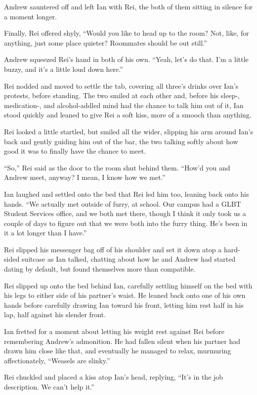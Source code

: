 \documentclass[12pt,letterpaper,oneside]{memoir}
\begin{document}
  Andrew sauntered off and left Ian with Rei, the both of them sitting in silence for a moment longer.

  Finally, Rei offered shyly, ``Would you like to head up to the room? Not, like, for anything, just some place quieter? Roommates should be out still.''

  Andrew squeezed Rei's hand in both of his own. ``Yeah, let's do that. I'm a little buzzy, and it's a little loud down here.''

  Rei nodded and moved to settle the tab, covering all three's drinks over Ian's protests, before standing. The two smiled at each other and, before his sleep-, medication-, and alcohol-addled mind had the chance to talk him out of it, Ian stood quickly and leaned to give Rei a soft kiss, more of a smooch than anything.

  Rei looked a little startled, but smiled all the wider, slipping his arm around Ian's back and gently guiding him out of the bar, the two talking softly about how good it was to finally have the chance to meet.

  ``So,'' Rei said as the door to the room shut behind them. ``How'd you and Andrew meet, anyway? I mean, I know how we met.''

  Ian laughed and settled onto the bed that Rei led him too, leaning back onto his hands. ``We actually met outside of furry, at school. Our campus had a GLBT Student Services office, and we both met there, though I think it only took us a couple of days to figure out that we were both into the furry thing. He's been in it a lot longer than I have.''

  Rei slipped his messenger bag off of his shoulder and set it down atop a hard-sided suitcase as Ian talked, chatting about how he and Andrew had started dating by default, but found themselves more than compatible.

  Rei slipped up onto the bed behind Ian, carefully settling himself on the bed with his legs to either side of his partner's waist. He leaned back onto one of his own hands before carefully drawing Ian toward his front, letting him rest half in his lap, half against his slender front.

  Ian fretted for a moment about letting his weight rest against Rei before remembering Andrew's admonition. He had fallen silent when his partner had drawn him close like that, and eventually he managed to relax, murmuring affectionately, ``Weasels are slinky.''

  Rei chuckled and placed a kiss atop Ian's head, replying, ``It's in the job description. We can't help it.''
\end{document}
